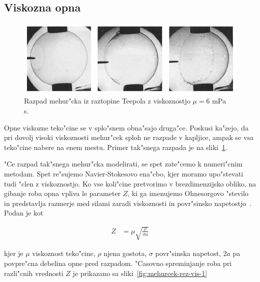 \documentclass[a4paper,10pt]{article}
\begin{document}
\newpage
\subsection{Viskozna opna}
\begin{figure}[h]
  \centering
\includegraphics[width=.9\textwidth]{./Slike/meh-vis-1}
\caption{Razpad mehur"cka iz raztopine Teepola z viskoznostjo $\mu = 6$ mPa s.~\cite{pandit}}
\label{fig:mehurcek-viskozni-razpad}
\end{figure}

Opne viskozne teko"cine se v splo"snem obna"sajo druga"ce. Poskusi ka"zejo, da pri dovolj visoki viskoznosti mehur"cek sploh ne razpade v kapljice, ampak se vsa teko"cine nabere na enem mestu. Primer tak"snega razpada je na sliki~\ref{fig:mehurcek-viskozni-razpad}. 

"Ce razpad tak"snega mehur"cka modelirati, se spet zate"cemo k numeri"cnim metodam. Spet re"sujemo Navier-Stokesovo ena"cbo, kjer moramo upo"stevati tudi "clen z viskoznostjo. Ko vse koli"cine pretvorimo v brezdimenzijsko obliko, na gibanje roba opna vpliva le parameter $Z$, ki ga imenujemo Ohnesorgovo "stevilo in predstavlja razmerje med silami zaradi viskoznosti in povr"sinsko napetostjo~\cite{scat}. Podan je kot

\begin{align}
Z &= \mu\sqrt{\frac{\rho}{\sigma a}} 
\end{align}

kjer je $\mu$ viskoznost teko"cine, $\rho$ njena gostota, $\sigma$ povr"sinska napetost, $2a$ pa povpre"cna debelina opne pred razpadom. "Casovno spreminjanje roba pri razli"cnih vrednosti $Z$ je prikazano sa sliki~\ref{fig:mehurcek-rez-vis-1}
\end{document}
